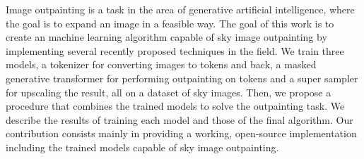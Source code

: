 \documentclass[12pt]{report}
\begin{document}

Image outpainting is a task in the area of generative artificial intelligence, where the goal is to expand an image in a feasible way. The goal of this work is to create an machine learning algorithm capable of sky image outpainting by implementing several recently proposed techniques in the field. We train three models, a tokenizer for converting images to tokens and back, a masked generative transformer for performing outpainting on tokens and a super sampler for upscaling the result, all on a dataset of sky images. Then, we propose a procedure that combines the trained models to solve the outpainting task. We describe the results of training each model and those of the final algorithm. Our contribution consists mainly in providing a working, open-source implementation including the trained models capable of sky image outpainting.
\end{document}
